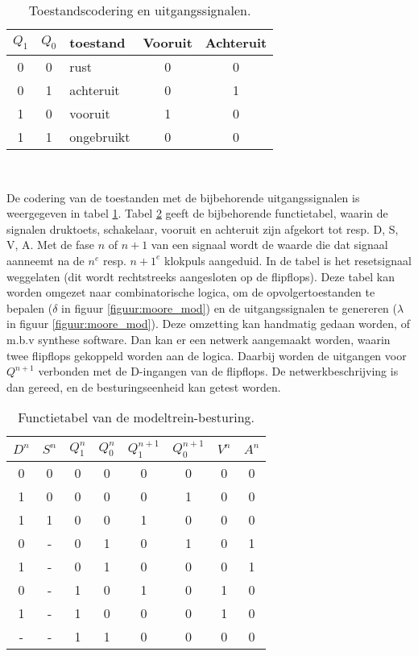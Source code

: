 \begin{table}[hbt]
\begin{center}
\begin{tabular}{cc|l|cc} 
\hline
$Q_{1}$ & $Q_{0}$ & toestand & Vooruit & Achteruit\\
\hline
\hline
0 & 0 & rust & 0 & 0\\
0 & 1 & achteruit & 0 & 1\\
1 & 0 & vooruit & 1 & 0\\
\hline
1 & 1 & ongebruikt & 0 & 0\\
\hline
\end{tabular} \\
\caption{Toestandscodering en uitgangssignalen.
\label{tabel:codering}
}
\end{center}
\end{table}

De codering van de toestanden met de bijbehorende uitgangssignalen is
weergegeven in tabel \ref{tabel:codering}.
Tabel \ref{tabel:toestanden} geeft de bijbehorende functietabel,
waarin de signalen druktoets, schakelaar,
vooruit en achteruit zijn afgekort tot resp. D, S, V, A.
Met de fase $n$ of $n+1$ van een signaal wordt
de waarde die dat signaal aanneemt na
de $n^{e}$ resp. $n+1^{e}$ klokpuls aangeduid.
In de tabel is het resetsignaal weggelaten (dit wordt rechtstreeks aangesloten
op de flipflops).
Deze tabel kan worden omgezet naar combinatorische logica,
om de opvolgertoestanden te bepalen ($\delta$ in figuur
\ref{figuur:moore_mod}) en de uitgangssignalen te
genereren ($\lambda$ in figuur
\ref{figuur:moore_mod}).
Deze omzetting kan handmatig gedaan worden,
of m.b.v synthese software.
Dan kan er een netwerk aangemaakt worden, waarin twee flipflops
gekoppeld worden aan de logica.
Daarbij worden de uitgangen voor $Q^{n+1}$ verbonden met de D-ingangen
van de flipflops.
De netwerkbeschrijving is dan gereed, en de besturingseenheid kan
getest worden.

\begin{table}[bth]
\begin{center}
\begin{tabular}{cccc|cc|cc} 
\hline
$D^{n}$ & $S^{n}$ & $Q_{1}^{n}$ & $Q_{0}^{n}$ & $Q_{1}^{n+1}$ & $Q_{0}^{n+1}$
& $V^{n}$ & $A^{n}$ \\
\hline
\hline
0 & 0 & 0 & 0 & 0 & 0 & 0 & 0\\
1 & 0 & 0 & 0 & 0 & 1 & 0 & 0\\
1 & 1 & 0 & 0 & 1 & 0 & 0 & 0\\
0 & - & 0 & 1 & 0 & 1 & 0 & 1\\
1 & - & 0 & 1 & 0 & 0 & 0 & 1\\
0 & - & 1 & 0 & 1 & 0 & 1 & 0\\
1 & - & 1 & 0 & 0 & 0 & 1 & 0\\
\hline
- & - & 1 & 1 & 0 & 0 & 0 & 0\\
\hline
\end{tabular}
\caption{Functietabel van de modeltrein-besturing.
\label{tabel:toestanden}
}
\end{center}
\end{table}

\cleardoublepage




